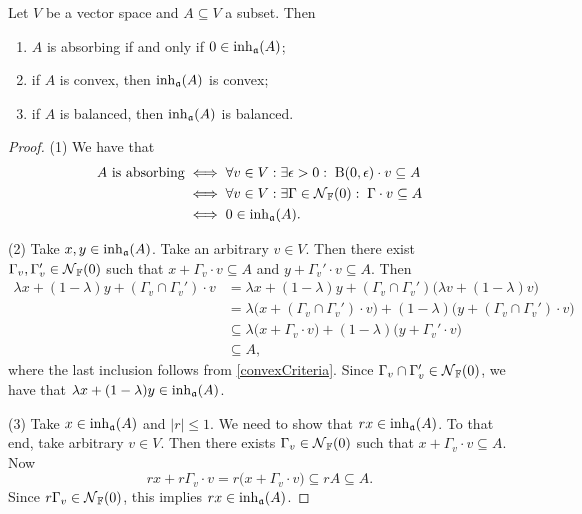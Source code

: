 \begin{proposition} \label{coreProperties}
Let $V$ be a vector space and $A \subseteq V$ a subset. Then
\begin{enumerate}
\item $A$ is absorbing \textup{if and only if} $0\in \operatorname{inh}_\mathfrak{a}(A)$;
\item if $A$ is convex, then $\operatorname{inh}_\mathfrak{a}(A)$ is convex;
\item if $A$ is balanced, then $\operatorname{inh}_\mathfrak{a}(A)$ is balanced.
\end{enumerate}
\end{proposition}
\begin{proof}
(1) We have that
\begin{align*}
\text{$A$ is absorbing} &\iff \forall v\in V: \exists \epsilon >0: \; \operatorname{B}(0,\epsilon)\cdot v\subseteq A \\
&\iff \forall v\in V: \exists \Gamma \in \operatorname{\mathcal{N}}_{\mathbb{F}}(0): \; \Gamma\cdot v\subseteq A \\
&\iff 0\in \operatorname{inh}_\mathfrak{a}(A).
\end{align*}

(2) Take $x,y \in \operatorname{inh}_\mathfrak{a}(A)$. Take an arbitrary $v\in V$. Then there exist $\Gamma_v,\Gamma_v'\in \operatorname{\mathcal{N}}_{\mathbb{F}}(0)$ such that $x+ \Gamma_v\cdot v \subseteq A$ and $y+ \Gamma_v'\cdot v \subseteq A$. Then
\begin{align*}
\lambda x+(1-\lambda)y + (\Gamma_v\cap\Gamma_v')\cdot v &= \lambda x+(1-\lambda)y + (\Gamma_v\cap\Gamma_v')\big(\lambda v+(1-\lambda)v\big) \\
&= \lambda \big(x+ (\Gamma_v\cap\Gamma_v')\cdot v\big) + (1-\lambda)\big(y+ (\Gamma_v\cap\Gamma_v')\cdot v\big) \\
&\subseteq \lambda \big(x+ \Gamma_v\cdot v\big) + (1-\lambda)\big(y+ \Gamma_v'\cdot v\big) \\
&\subseteq A,
\end{align*}
where the last inclusion follows from \ref{convexCriteria}. Since $\Gamma_v\cap\Gamma_v'\in\operatorname{\mathcal{N}}_{\mathbb{F}}(0)$, we have that $\lambda x+(1-\lambda)y\in \operatorname{inh}_\mathfrak{a}(A)$.

(3) Take $x\in \operatorname{inh}_\mathfrak{a}(A)$ and $|r|\leq 1$. We need to show that $rx\in \operatorname{inh}_\mathfrak{a}(A)$. To that end, take arbitrary $v\in V$. Then there exists $\Gamma_v\in\operatorname{\mathcal{N}}_{\mathbb{F}}(0)$ such that $x+\Gamma_v\cdot v\subseteq A$. Now
\[ rx+ r\Gamma_v\cdot v = r\big(x+\Gamma_v\cdot v\big) \subseteq rA \subseteq A. \]
Since $r\Gamma_v\in \operatorname{\mathcal{N}}_{\mathbb{F}}(0)$, this implies $rx\in \operatorname{inh}_\mathfrak{a}(A)$.
\end{proof}

